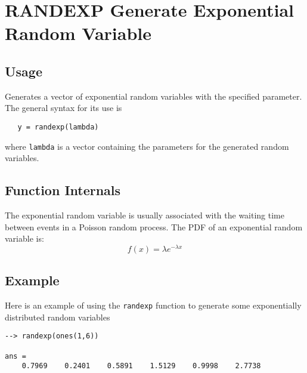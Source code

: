 \section{RANDEXP Generate Exponential Random Variable}

\subsection{Usage}

Generates a vector of exponential random variables with
the specified parameter.  The general syntax for its use is
\begin{verbatim}
   y = randexp(lambda)
\end{verbatim}
where \verb|lambda| is a vector containing the parameters for
the generated random variables.
\subsection{Function Internals}

The exponential random variable is usually associated with
the waiting time between events in a Poisson random process.
The PDF of an exponential random variable is:
\[
   f(x) = \lambda e^{-\lambda x}
\]
\subsection{Example}

Here is an example of using the \verb|randexp| function to generate
some exponentially distributed random variables
\begin{verbatim}
--> randexp(ones(1,6))

ans = 
    0.7969    0.2401    0.5891    1.5129    0.9998    2.7738 
\end{verbatim}
